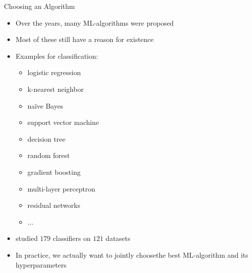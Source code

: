 \begin{frame}[c]{Choosing an Algorithm}

\begin{itemize}
	\item Over the years, many ML-algorithms were proposed
	\pause
	\item Most of these still have a reason for existence
	\pause
	\item Examples for classification:
	\begin{itemize}
		\item logistic regression
		\item k-nearest neighbor
		\item na\"ive Bayes
		\item support vector machine
		\item decision tree
		\item random forest
		\item gradient boosting
		\item multi-layer perceptron
		\item residual networks
		\item ...
	\end{itemize}
	\pause
	\item studied $179$ classifiers on $121$ datasets   	     
	\pause
	\item In practice, we actually want to jointly choose\newline the best ML-algorithm and its hyperparameters
\end{itemize}


\end{frame}
